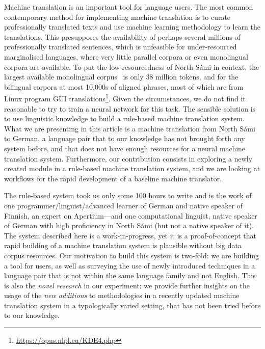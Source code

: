 \documentclass{flammie}
\begin{document}
Machine translation is an important tool for language users.  The most common
contemporary method for implementing machine translation is to curate
professionally translated texts and use machine learning methodology to learn
the translations.  This presupposes the availability of perhaps several millions
of professionally translated sentences, which is unfeasible for under-resourced
marginalised languages, where very little parallel corpora or even monolingual
corpora are available.  To put the low-resourcedness of North Sámi in context,
the largest available monolingual corpus~\cite{sikor_06.11.2018} is only 38
million tokens, and for the bilingual corpora at most 10,000s of aligned
phrases, most of which are from Linux program GUI
translations\footnote{\url{https://opus.nlpl.eu/KDE4.php}}.  Given the
circumstances, we do not find it reasonable to try to train a neural network for
this task.  The sensible solution is to use linguistic knowledge to build a
rule-based machine translation system.  What we are presenting in this article
is a machine translation from North Sámi to German, a language pair that to our
knowledge has not brought forth any system before, and that does not have enough
resources for a neural machine translation system.  Furthermore, our
contribution consists in exploring a newly created module in a rule-based
machine translation system, and we are looking at workflows for the rapid
development of a baseline machine translator.

The rule-based system took us only some 100 hours to write and is the work of
one programmer/linguist/advanced learner of German and native speaker of
Finnish, an expert on Apertium---and one computational linguist, native speaker
of German with high proficiency in North Sámi (but not a native speaker of it).
The system described here is a work-in-progress, yet it is a proof-of-concept
that rapid building of a machine translation system is plausible without big
data corpus resources.  Our motivation to build this system is two-fold: we are
building a tool for users, as well as surveying the use of newly introduced
techniques in a language pair that is not within the same language family and
not English.  This is also the \textit{novel research} in our experiment: we
provide further insights on the usage of the \textit{new additions} to
methodologies in a recently updated machine translation system in a
typologically varied setting, that has not been tried before to our knowledge.
\end{document}
